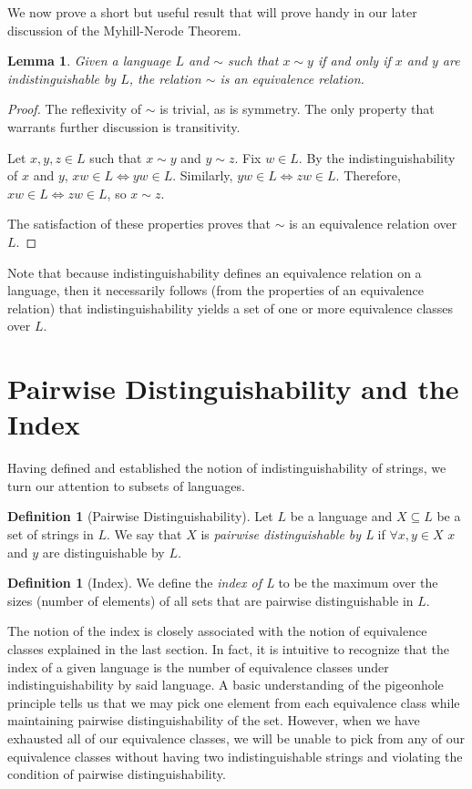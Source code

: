 \documentclass[12pt]{article}
\newtheorem{lemma}[theorem]{Lemma}
\theoremstyle{definition}
\newtheorem{definition}[theorem]{Definition}
\theoremstyle{remark}
\begin{document}
We now prove a short but useful result that will prove handy in our later discussion of the Myhill-Nerode Theorem.

\begin{lemma}
Given a language $L$ and $\sim$ such that $x \sim y$ if and only if $x$ and $y$ are indistinguishable by $L$, the relation $\sim$ is an equivalence relation.
\end{lemma}

\begin{proof}
The reflexivity of $\sim$ is trivial, as is symmetry. The only property that warrants further discussion is transitivity.

Let $x,y,z \in L$ such that $x \sim y$ and $y \sim z$. Fix $w \in L$. By the indistinguishability of $x$ and $y$, $xw \in L \Leftrightarrow yw \in L$. Similarly, $yw \in L \Leftrightarrow zw \in L$. Therefore, $xw \in L \Leftrightarrow zw \in L$, so $x \sim z$.

The satisfaction of these properties proves that $\sim$ is an equivalence relation over $L$.
\end{proof}

Note that because indistinguishability defines an equivalence relation on a language, then it necessarily follows (from the properties of an equivalence relation) that indistinguishability yields a set of one or more equivalence classes over $L$.

\section{Pairwise Distinguishability and the Index}

Having defined and established the notion of indistinguishability of strings, we turn our attention to subsets of languages.

\begin{definition}[Pairwise Distinguishability]
Let $L$ be a language and $X \subseteq L$ be a set of strings in $L$. We say that $X$ is \emph{pairwise distinguishable by L} if $\forall x,y \in X$ $x$ and $y$ are distinguishable by $L$.
\end{definition}

\begin{definition}[Index]
We define the \emph{index of L} to be the maximum over the sizes (number of elements) of all sets that are pairwise distinguishable in $L$.
\end{definition}

The notion of the index is closely associated with the notion of equivalence classes explained in the last section. In fact, it is intuitive to recognize that the index of a given language is the number of equivalence classes under indistinguishability by said language. A basic understanding of the pigeonhole principle tells us that
we may pick one element from each equivalence class while maintaining pairwise distinguishability of the set. However, when we have exhausted all of our equivalence classes, we will be unable to pick from any of our equivalence classes without having two indistinguishable strings and violating the condition of pairwise
distinguishability.
\end{document}
